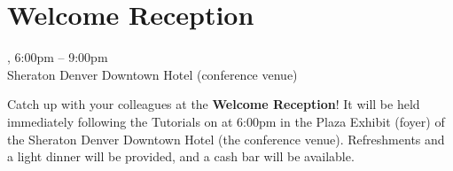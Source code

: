 \clearpage
\section[Welcome Reception]{Welcome Reception}
\setheaders{}{\daydateyear}

\begin{center}


\daydateyear, 6:00pm -- 9:00pm \vspace{1em}\\
\WelcomeReceptionLoc
Sheraton Denver Downtown Hotel (conference venue)
\end{center}

\noindent Catch up with your colleagues at the \textbf{Welcome
Reception}! It will be held immediately following the Tutorials
on \daydate at 6:00pm in the Plaza Exhibit (foyer) of the Sheraton
Denver Downtown Hotel (the conference venue).  Refreshments and a
light dinner will be provided, and a cash bar will be available.
